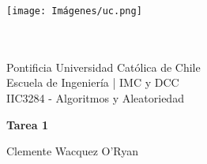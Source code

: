 \documentclass{article}
\begin{document}
\begin{minipage}{2.5cm}
\texttt{[image: Imágenes/uc.png]}
\end{minipage}
\begin{minipage}{15cm}
\ \\
\ \\
    {\sc Pontificia Universidad Católica de Chile\\
    Escuela de Ingeniería | IMC y DCC \\
    IIC3284 - Algoritmos y Aleatoriedad
    }
\end{minipage}
\vspace{3ex}

\centerline{\bf \huge Tarea 1}
\centerline{Clemente Wacquez O'Ryan}


\end{document}
